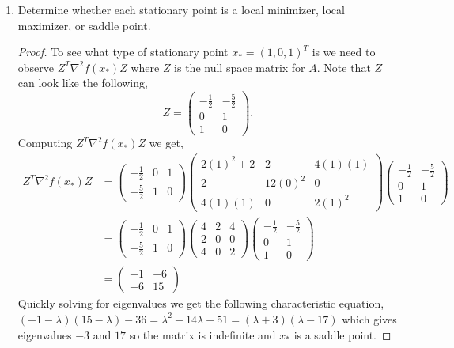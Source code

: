 \documentclass[12pt]{article}
\makeatletter
\theoremstyle{homework}
\newenvironment{exercise}[1]
{\def\@currentlabel{#1}\exercisecore}
{\endexercisecore}
\makeatother
\begin{document}
\begin{exercise}{2.1}
\begin{enumerate}
    \item[(ii)] Determine whether each stationary point is a local minimizer, local maximizer, or saddle point. 
    \begin{proof} To see what type of stationary point $x_* = (1, 0, 1)^T$ is we need to observe $Z^T\nabla^2f(x_*)Z$ where 
      $Z$ is the null space matrix for $A$. Note that $Z$ can look like the following, 
      \begin{equation*}
        Z = \begin{pmatrix}
          -\frac{1}{2} & -\frac{5}{2}\\
          0 & 1\\
          1 & 0
        \end{pmatrix}.
      \end{equation*}
      Computing $Z^T\nabla^2f(x_*)Z$ we get, 
      \begin{align*}
        Z^T\nabla^2f(x_*)Z & = \begin{pmatrix}
          -\frac{1}{2} & 0 & 1\\ 
          -\frac{5}{2} & 1 & 0
        \end{pmatrix}
        \begin{pmatrix}
          2(1)^2 + 2 & 2& 4(1)(1)\\
          2& 12(0)^2 & 0\\
          4(1)(1) & 0 & 2(1)^2
        \end{pmatrix}
        \begin{pmatrix}
          -\frac{1}{2} & -\frac{5}{2}\\
          0 & 1\\
          1 & 0
        \end{pmatrix}\\
        &=\begin{pmatrix}
          -\frac{1}{2} & 0 & 1\\ 
          -\frac{5}{2} & 1 & 0
        \end{pmatrix}
        \begin{pmatrix}
          4 & 2& 4\\
          2& 0 & 0\\
          4 & 0 & 2
        \end{pmatrix}
        \begin{pmatrix}
          -\frac{1}{2} & -\frac{5}{2}\\
          0 & 1\\
          1 & 0
        \end{pmatrix}\\
        &= 
        \begin{pmatrix}-1&-6\\ -6&15\end{pmatrix}
      \end{align*}
      Quickly solving for eigenvalues we get the following characteristic equation, 
      $(-1-\lambda)(15 - \lambda) - 36 = \lambda^2-14\lambda-51 = (\lambda + 3)(\lambda - 17)$
      which gives eigenvalues $-3$ and $17$ so the matrix is indefinite and $x_*$ is a saddle point. 
    \end{proof}
  \end{enumerate}
\end{exercise}
\end{document}

